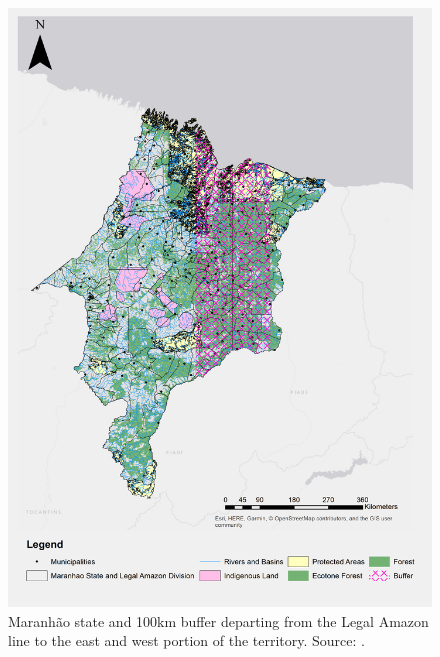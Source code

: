 \begin{figure}[H]
  \centering
  \includegraphics[width=1\textwidth, inner]{MaranhaoChapter2_Fig2.png}
\caption[Maranhão  state and 100km buffer departing from the Legal Amazon line to the east and west portion of the territory]{Maranhão  state and 100km buffer departing from the Legal Amazon line to the east and west portion of the territory. Source: \citep{MMMAwebsite,nugeo_2018,embrapa_2018}.}
\label{fig:buffer}
\end{figure}


